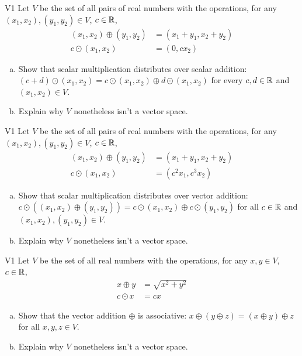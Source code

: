\begin{problem}{V1}
Let \(V\) be the set of all pairs of real numbers with the operations, for any \((x_1,x_2), (y_1,y_2) \in V\), \(c\in \mathbb{R}\),
\begin{align*}
(x_1,x_2) \oplus (y_1,y_2) &= (x_1+y_1,x_2+y_2) \\
c \odot (x_1,x_2) &= (0, cx_2)
\end{align*}
\begin{enumerate}[(a)]
\item Show that scalar multiplication distributes over scalar addition:
      \((c+d)\odot(x_1,x_2)=c\odot(x_1,x_2) \oplus d\odot(x_1,x_2)\) for every \(c,d \in \mathbb{R}\) and \( (x_1,x_2) \in V\).
\item Explain why \(V\) nonetheless isn't a vector space.
\end{enumerate}
\end{problem}


\begin{problem}{V1}
 Let \(V\) be the set of all pairs of real numbers with the operations, for any \((x_1,x_2), (y_1,y_2) \in V\), \(c\in \mathbb{R}\),
 \begin{align*}
 (x_1,x_2) \oplus (y_1,y_2) &= (x_1+y_1,x_2+y_2) \\
 c \odot (x_1,x_2) &= (c^2x_1, c^3x_2)
 \end{align*}
 \begin{enumerate}[(a)]
 \item Show that scalar multiplication distributes over vector addition:
       \(c\odot((x_1,x_2) \oplus (y_1,y_2))=c\odot(x_1,x_2) \oplus c\odot(y_1,y_2)\) for all \(c \in \mathbb{R}\) and \( (x_1,x_2), (y_1,y_2) \in V\).
\item Explain why \(V\) nonetheless isn't a vector space.
 \end{enumerate}
\end{problem}
 
\begin{problem}{V1}
 Let \(V\) be the set of all real numbers with the operations, for any \(x,y\in V\), \(c\in \mathbb{R}\),
 \begin{align*}
 x \oplus y &= \sqrt{x^2+y^2} \\
 c \odot x &= c x
 \end{align*}
 \begin{enumerate}[(a)]
 \item Show that the vector addition \(\oplus\) is associative:
       \(x \oplus (y \oplus z)=(x\oplus y)\oplus z\) for all \(x,y,z \in V\).
\item Explain why \(V\) nonetheless isn't a vector space.
 \end{enumerate}
\end{problem}

